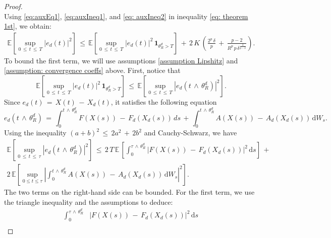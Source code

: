 \begin{proof}
\begin{equation}
        \label{eq: auxIneq2}
    \end{equation}
    Using \eqref{eq:auxEq1}, \eqref{eq:auxIneq1}, and \eqref{eq: auxIneq2} in
    inequality \eqref{eq: theorem 1st}, we obtain: 
    \begin{multline}
        \mathbb E \left[\sup_{0\, {\leq} \,t\, {\leq} \,T} |e_d(t)|^2 \right] \, {\leq} \,\mathbb E
        \left[\sup_{0\, {\leq} \,t\, {\leq} \,T} |e_d(t)|^2\,\mathbf 1_{{\theta}_R^d >T} \right]\,+\,
        2\, K\, \left(\frac{2^p\,{\delta}}{p}\,+\,\frac{p-2}{R^p\,p\,{\delta}^{\frac{2}{p-2}}}\right).
        \label{eq: theorem 2nd}        
    \end{multline}
    To bound the first term, we will use assumptions \ref{assumption Lipshitz}
    and \ref{assumption: convergence coeffs} above. First, notice that 
    \begin{equation}
        \mathbb E \left[\sup_{0\, {\leq} \,t\, {\leq} \,T} |e_d(t)|^2 \, \mathbf 1_{{\theta}_R^d >T} \right]
        \, {\leq} \,\mathbb E \left[\sup_{0\, {\leq} \,t\, {\leq} \,T} |e_d(t\,{\wedge}\,{\theta}_R^d)|^2 \right].
        \label{eq:reformulation error term}
    \end{equation}
    Since $e_d(t)\,=\,X(t)\,-\,X_d(t)$, it satisfies the following equation
    $$
    e_d(t\,{\wedge}\,{\theta}_R^d) \,=\, {\int}_0^{t\,{\wedge}\,{\theta}_R^d} F(X(s))\,-\,F_d(X_d(s))\, ds
    \,+\, {\int}_0^{t\,{\wedge}\,{\theta}_R^d} A(X(s))\,-\,A_d(X_d(s))\,\mathrm dW_s.
    $$
    Using the inequality $(a+b)^2\, {\leq} \,2a^2\,+\,2b^2$ and Cauchy-Schwarz, we have
    \begin{multline}
        \mathbb E \left[ \sup_{0\, {\leq} \,t\, {\leq} \,{\tau}} |e_d(t\,{\wedge}\,{\theta}_R^d)|^2\right]\, {\leq} \,
        2\,T\,\mathbb E\,\left[ {\int}_0^{{\tau}\,{\wedge}\,{\theta}_R^d}
            |F(X(s))\,-\,F_d(X_d(s))|^2 \,\mathrm ds\right] \,+\, \\ 2\,\mathbb E \left[\sup_{0 {\leq} 
                t {\leq} {\tau}} \left| 
                {\int}_0^{t\,{\wedge}\,{\theta}_R^d} A(X(s))\,-\,A_d(X_d(s))\,\mathrm dW_s \right|^2\right].
        \label{eq:main eq global}
    \end{multline}
    The two terms on the right-hand side can be bounded. For the first term, we
    use the triangle inequality and the assumptions to deduce:
    \begin{equation}
        \begin{aligned}
            {\int}_0^{{\tau}\,{\wedge}\,{\theta}_R^d} & |F(X(s))\,-\,F_d(X_d(s))|^2\,\mathrm ds \\ 

\end{aligned}
\end{equation}
\end{proof}
